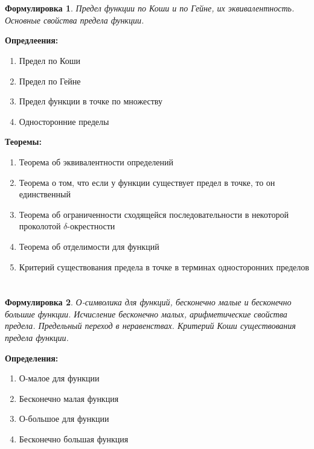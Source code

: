 \documentclass[a4paper]{article}
\theoremstyle{plain}
\newtheorem*{st}{Формулировка}
\theoremstyle{definition}
\theoremstyle{remark}
\begin{document}
\section{}
\begin{st}
    Предел функции по Коши и по Гейне, их эквивалентность. Основные свойства предела функции.
\end{st}

\textbf{Опредлеения:}
\begin{enumerate}
    \item Предел по Коши
    \item Предел по Гейне
    \item Предел функции в точке по множеству
    \item Односторонние пределы
\end{enumerate}

\textbf{Теоремы:}
\begin{enumerate}
    \item Теорема об эквивалентности определений
    \item Теорема о том, что если у функции существует предел в точке, то он единственный
    \item Теорема об ограниченности сходящейся последовательности в некоторой проколотой $\delta$-окрестности
    \item Теорема об отделимости для функций
    \item Критерий существования предела в точке в терминах односторонних пределов
\end{enumerate}


\section{}
\begin{st}
    О-символика для функций, бесконечно малые и бесконечно большие функции. Исчисление бесконечно малых, арифметические свойства предела. Предельный переход в неравенствах. Критерий Коши существования предела функции.
\end{st}

\textbf{Определения:}
\begin{enumerate}
    \item О-малое для функции
    \item Бесконечно малая функция
    \item О-большое для функции
    \item Бесконечно большая функция
\end{enumerate}
\end{document}
